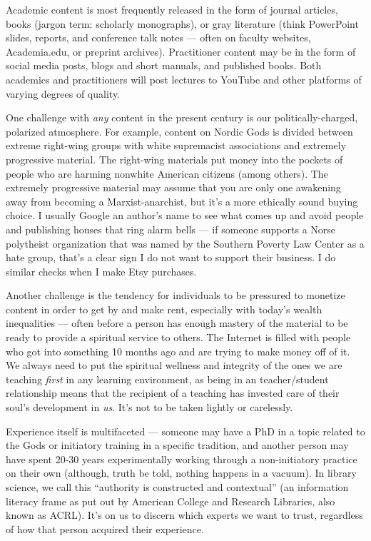 \documentclass[
]{book}
\begin{document}
Academic content is most frequently released in the form of journal articles, books (jargon term: scholarly monographs), or gray literature (think PowerPoint slides, reports, and conference talk notes --- often on faculty websites, Academia.edu, or preprint archives). Practitioner content may be in the form of social media posts, blogs and short manuals, and published books. Both academics and practitioners will post lectures to YouTube and other platforms of varying degrees of quality.

One challenge with \emph{any} content in the present century is our politically-charged, polarized atmosphere. For example, content on Nordic Gods is divided between extreme right-wing groups with white supremacist associations and extremely progressive material. The right-wing materials put money into the pockets of people who are harming nonwhite American citizens (among others). The extremely progressive material may assume that you are only one awakening away from becoming a Marxist-anarchist, but it's a more ethically sound buying choice. I usually Google an author's name to see what comes up and avoid people and publishing houses that ring alarm bells --- if someone supports a Norse polytheist organization that was named by the Southern Poverty Law Center as a hate group, that's a clear sign I do not want to support their business. I do similar checks when I make Etsy purchases.

Another challenge is the tendency for individuals to be pressured to monetize content in order to get by and make rent, especially with today's wealth inequalities --- often before a person has enough mastery of the material to be ready to provide a spiritual service to others. The Internet is filled with people who got into something 10 months ago and are trying to make money off of it. We always need to put the spiritual wellness and integrity of the ones we are teaching \emph{first} in any learning environment, as being in an teacher/student relationship means that the recipient of a teaching has invested care of their soul's development in \emph{us}. It's not to be taken lightly or carelessly.

Experience itself is multifaceted --- someone may have a PhD in a topic related to the Gods or initiatory training in a specific tradition, and another person may have spent 20-30 years experimentally working through a non-initiatory practice on their own (although, truth be told, nothing happens in a vacuum). In library science, we call this ``authority is constructed and contextual'' (an information literacy frame as put out by American College and Research Libraries, also known as ACRL). It's on us to discern which experts we want to trust, regardless of how that person acquired their experience.
\end{document}

